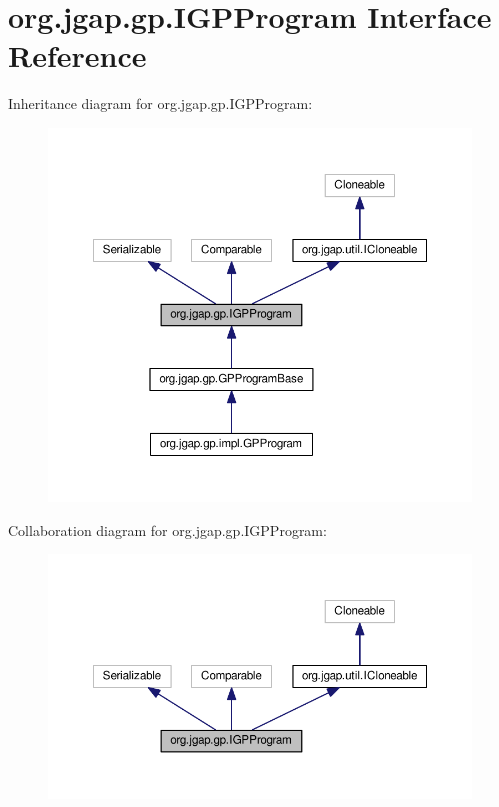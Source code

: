 \hypertarget{interfaceorg_1_1jgap_1_1gp_1_1_i_g_p_program}{\section{org.\-jgap.\-gp.\-I\-G\-P\-Program Interface Reference}
\label{interfaceorg_1_1jgap_1_1gp_1_1_i_g_p_program}
}


Inheritance diagram for org.\-jgap.\-gp.\-I\-G\-P\-Program\-:
\nopagebreak
\begin{figure}[H]
\begin{center}
\leavevmode
\includegraphics[width=350pt]{interfaceorg_1_1jgap_1_1gp_1_1_i_g_p_program__inherit__graph}
\end{center}
\end{figure}


Collaboration diagram for org.\-jgap.\-gp.\-I\-G\-P\-Program\-:
\nopagebreak
\begin{figure}[H]
\begin{center}
\leavevmode
\includegraphics[width=350pt]{interfaceorg_1_1jgap_1_1gp_1_1_i_g_p_program__coll__graph}
\end{center}
\end{figure}
